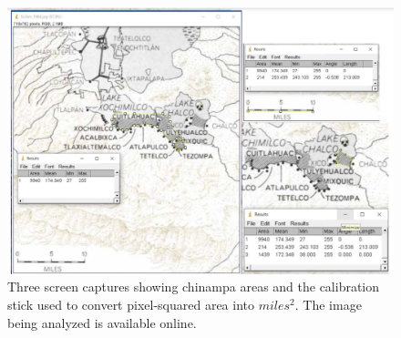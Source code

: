 \documentclass[prb,preprint]{revtex4-2}
\begin{document}
\begin{figure}[ht!]
\centering
\includegraphics[width=\columnwidth]{imageJ_analysis.jpg}
\caption{
Three screen captures showing chinampa areas and the calibration stick used to convert pixel-squared area into $miles^2$.  The image being analyzed is available online. \cite{Chinampas_1964}
}
\label{imageJ}
\end{figure}








\clearpage
\end{document}
